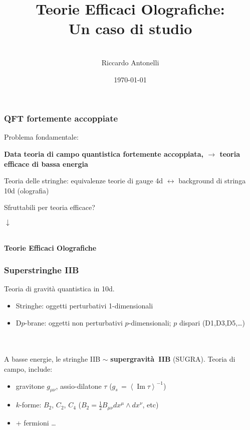 \documentclass[aspectratio=43,mathserif]{beamer}
\title{Teorie Efficaci Olografiche:\\ Un caso di studio}
\author{\vspace{10pt}\\\large Riccardo Antonelli }
\date{\today}
\newcommand{\vev}[1]{\left\langle{#1}\right\rangle}
\renewcommand{\Im}{\ensuremath{\operatorname{Im}}}
\begin{document}
\begin{frame}
	\maketitle
\end{frame}

\begin{frame}
	\frametitle{QFT fortemente accoppiate}
	Problema fondamentale:
	\begin{center}\textbf{
		Data teoria di campo quantistica fortemente accoppiata, $\longrightarrow$ teoria efficace di bassa energia}
	\end{center}

	\vfill Teoria delle stringhe: equivalenze teorie di gauge 4d $\leftrightarrow$ background di stringa 10d (olografia)

	\vfill \begin{center}Sfruttabili per teoria efficace?\end{center}

	\begin{center} $\downarrow$

		~\\

		\textbf{Teorie Efficaci Olografiche}
	\end{center}



\end{frame}

\begin{frame}
	\frametitle{Superstringhe IIB}
	Teoria di gravità quantistica in 10d.

	\begin{itemize}
		\item Stringhe: oggetti perturbativi 1-dimensionali
		\item D$p$-brane: oggetti non perturbativi $p$-dimensionali; $p$ dispari (D1,D3,D5,\ldots)
	\end{itemize}

	~\\~\\

	A basse energie, le stringhe IIB $\sim$ \textbf{supergravità~IIB} (SUGRA). Teoria di campo, include:

	\begin{itemize}
		\item gravitone $g_{\mu\nu}$, assio-dilatone $\tau$ \quad \quad (${g_s\, = \vev{\Im \tau}^{-1}}$)
		\item $k$-forme: $B_2$, $C_2$, $C_4$ \quad \quad (${\scriptstyle B_2 = \frac{1}{2} B_{\mu\nu} dx^\mu \wedge dx^\nu}$, etc)
		\item + fermioni \ldots
	\end{itemize}
\end{frame}
\end{document}
